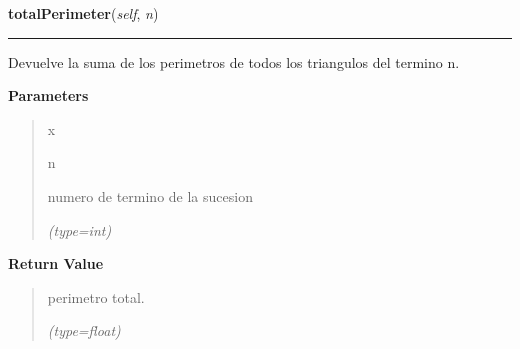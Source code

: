 \hspace{.8\funcindent}\begin{boxedminipage}{\funcwidth}

    \raggedright \textbf{totalPerimeter}(\textit{self}, \textit{n})

    \vspace{-1.5ex}

    \rule{\textwidth}{0.5\fboxrule}
\setlength{\parskip}{2ex}
    Devuelve la suma de los perimetros de todos los triangulos del termino 
    n.

\setlength{\parskip}{1ex}
      \textbf{Parameters}
      \vspace{-1ex}

      \begin{quote}
        \begin{Ventry}{x}

          \item[n]

          numero de termino de la sucesion

            {\it (type=int)}

        \end{Ventry}

      \end{quote}

      \textbf{Return Value}
    \vspace{-1ex}

      \begin{quote}
      perimetro total.

      {\it (type=float)}

      \end{quote}

    \end{boxedminipage}

    \label{FractalZE:sierpinsky:Sierpinsky:triangleArea}

    \vspace{0.5ex}

